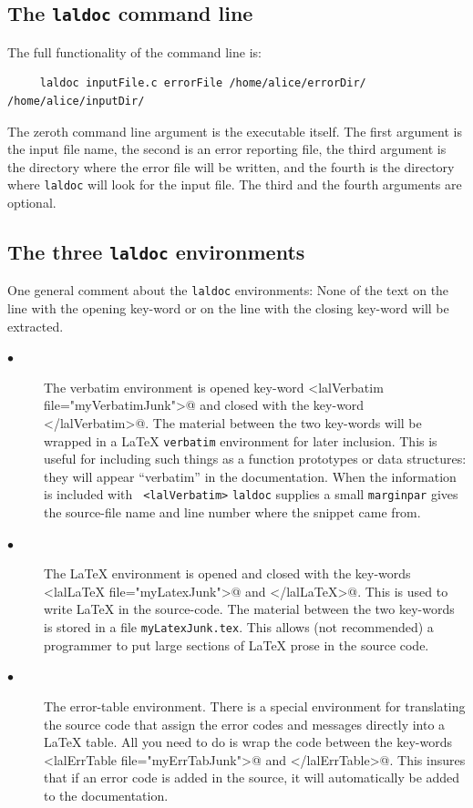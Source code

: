\documentclass[oneside]{book}
\begin{document}
\subsection{ The {\texttt {laldoc}} command line }
The full functionality of the command line is:
\begin{verbatim}
     laldoc inputFile.c errorFile /home/alice/errorDir/ /home/alice/inputDir/
\end{verbatim}
\noindent
The zeroth command line argument is the executable itself.
The first argument is the input file name, the second is an error reporting
file, the third argument is the directory where the error file will be
written, and the fourth is the directory where {\tt laldoc} will look
for the input file.  The third and the fourth arguments are optional.


\subsection{ The three {\texttt {laldoc}} environments }

One general comment about the  {\texttt {laldoc}} environments:
None of the text on the line with the opening key-word or on the
line with the closing key-word will be extracted.

\begin{description}
\item[$\bullet$ ]
The verbatim environment is opened key-word 
{\verb@<lalVerbatim file="myVerbatimJunk">@}  and closed with the key-word
{\verb@</lalVerbatim>@}. The material between the two key-words will
be wrapped in a {\LaTeX} {\tt verbatim} environment for later
inclusion.  This is useful for including such things as a function
prototypes or data structures: they will appear ``verbatim'' in the
documentation.  When the information is included with {\tt
<lalVerbatim>} {\tt laldoc} supplies a small {\tt marginpar} gives the
source-file name and line number where the snippet came from.
\vspace*{-0.05in}
\item[$\bullet$ ] 
The {\LaTeX} environment is opened and closed with the key-words
{\verb@<lalLaTeX file="myLatexJunk">@}  and {\verb@</lalLaTeX>@}. This is
used to write {\LaTeX} in the source-code. The material between the two
key-words is stored in a file {\tt myLatexJunk.tex}.  This allows (not
recommended) a programmer to put large sections of {\LaTeX} prose in the
source code.  
\vspace*{-0.05in}
\item[$\bullet$ ] 
The error-table environment.  There is a special environment for
translating the source code that assign the error codes and messages
directly into a {\LaTeX} table. All you need to do is wrap the code
between the key-words {\verb@<lalErrTable file="myErrTabJunk">@} and
{\verb@</lalErrTable>@}.  This insures that if an error code is added
in the source, it will automatically be added to the documentation.
\vspace*{-0.051in}
\end{description}
\end{document}
